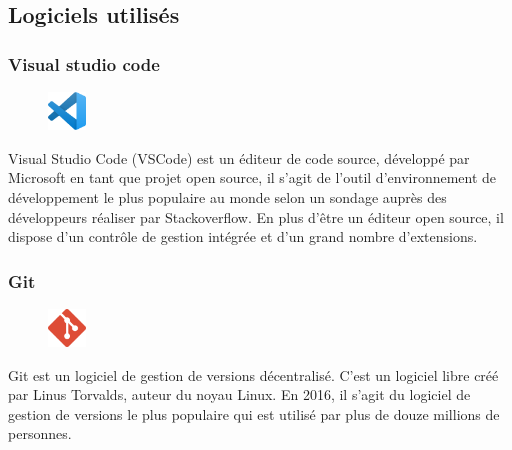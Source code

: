     
    \subsection{Logiciels utilisés}
    
        \subsubsection*{Visual studio code}
            \begin{figure}
              \vspace{-20pt}
              \begin{center}
                \includegraphics[width=0.09\textwidth]{images/VSCode logo.png}
                \label{fig66}
              \end{center}
              \vspace{-20pt}
              \vspace{-10pt}
            \end{figure}
            Visual Studio Code (VSCode) est un éditeur de code source, développé par Microsoft en tant que projet open source, il s’agit de l’outil d’environnement de développement le plus populaire au monde selon un sondage auprès des développeurs réaliser par Stackoverflow\cite{13}. En plus d’être un éditeur open source, il dispose d’un contrôle de gestion intégrée et d’un grand nombre d’extensions\cite{41}.
            
            
        \subsubsection*{Git}
            \begin{figure}
              \vspace{-28pt}
              \begin{center}
                \includegraphics[width=0.09\textwidth]{images/git logo.png}
                \label{fig67}
              \end{center}
              \vspace{-20pt}
              \vspace{-10pt}
            \end{figure}            
            Git est un logiciel de gestion de versions décentralisé. C’est un logiciel libre créé par Linus Torvalds, auteur du noyau Linux. En 2016, il s’agit du logiciel de gestion de versions le plus populaire qui est utilisé par plus de douze millions de personnes\cite{43}.
            
